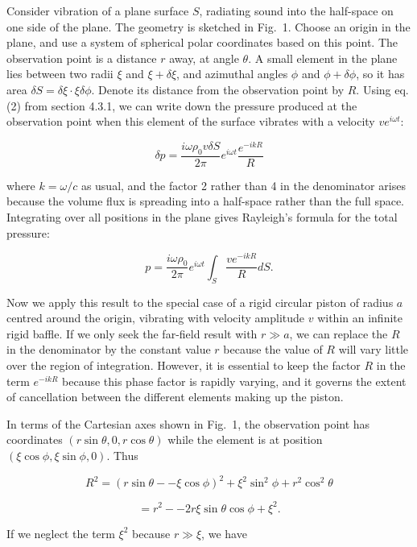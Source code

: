   Consider vibration of a plane surface $S$, radiating sound into the 
  half-space on one side of the plane. The geometry is sketched in Fig.\ 1. 
  Choose an origin in the plane, and use a system of spherical polar 
  coordinates based on this point. The observation point is a distance $r$ 
  away, at angle $\theta$. A small element in the plane lies between two radii 
  $\xi$ and $\xi+\delta \xi$, and azimuthal angles $\phi$ and $\phi + \delta 
  \phi$, so it has area $\delta S= \delta \xi \cdot \xi \delta \phi$. Denote 
  its distance from the observation point by $R$. Using eq. (2) from section 
  4.3.1, we can write down the pressure produced at the observation point when 
  this element of the surface vibrates with a velocity $v e^{i \omega t}$: 

  $$\delta p = \dfrac{i \omega \rho_0 v \delta S}{2 \pi} e^{i \omega t} 
  \dfrac{e^{-i k R}}{R} \tag{1}$$ 

  where $k=\omega /c$ as usual, and the factor 2 rather than 4 in the 
  denominator arises because the volume flux is spreading into a half-space 
  rather than the full space. Integrating over all positions in the plane gives 
  Rayleigh's formula for the total pressure: 

  $$p = \dfrac{i \omega \rho_0}{2 \pi} e^{i \omega t} \int_S{\dfrac{v e^{-i k 
  R}}{R} dS} . \tag{2}$$ 

  Now we apply this result to the special case of a rigid circular piston of 
  radius $a$ centred around the origin, vibrating with velocity amplitude $v$ 
  within an infinite rigid baffle. If we only seek the far-field result with $r 
  \gg a$, we can replace the $R$ in the denominator by the constant value $r$ 
  because the value of $R$ will vary little over the region of integration. 
  However, it is essential to keep the factor $R$ in the term $e^{-ikR}$ 
  because this phase factor is rapidly varying, and it governs the extent of 
  cancellation between the different elements making up the piston. 

  In terms of the Cartesian axes shown in Fig.\ 1, the observation point has 
  coordinates $(r \sin \theta, 0, r \cos \theta)$ while the element is at 
  position $(\xi \cos \phi, \xi \sin \phi, 0)$. Thus 

  $$R^2=(r \sin \theta -- \xi \cos \phi)^2 + \xi^2 \sin^2 \phi + r^2 \cos^2 
  \theta $$ 

  $$= r^2 -- 2 r \xi \sin \theta \cos \phi +\xi^2 . \tag{3}$$ 

  If we neglect the term $\xi^2$ because $r \gg \xi$, we have 

